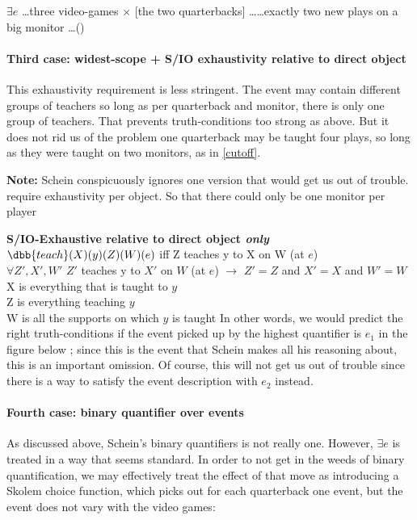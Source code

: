 \ex
$\exists e$ \ldots three video-games $\times$ [the two quarterbacks] \ldots  \ldots exactly two new plays on a big monitor \ldots ()

\xe
%


\paragraph{Third case: widest-scope + S/IO exhaustivity relative to direct object} This exhaustivity requirement is less stringent. The event may contain different groups of teachers so long as per quarterback and monitor, there is only one group of teachers. That prevents truth-conditions too strong as above. But it does not rid us of the problem one quarterback may be taught four plays, so long as they were taught on two monitors, as in \cref{cutoff}.

\textbf{Note:} Schein conspicuously ignores one version that would get us out of trouble. \cnextx require exhaustivity per object. So that there could only be one monitor per player

\pex \textbf{S/IO-Exhaustive relative to direct object \emph{only}}
\a 
$\dbb{teach}(X)(y)(Z)(W)(e)$ iff Z teaches y to X on W (at $e$)\\
$\forall Z', X', W'$ $Z'$ teaches y to $X'$ on $W$ (at $e$) $\rightarrow$ $Z'=Z$ and $X'=X$ and $W'=W$\\
\a 
X is everything that is taught to $y$\\
Z is everything teaching $y$\\
W is all the supports on which $y$ is taught
\xe
%
In other words, we would predict the right truth-conditions if the event picked up by the highest quantifier is $e_1$ in the figure below ; since this is the event that Schein makes all his reasoning about, this is an important omission. Of course, this will not get us out of trouble since there is a way to satisfy the event description with $e_2$ instead.

\ex
\renewcommand{\scale}{0.75}

\xe
%


\paragraph{Fourth case: binary quantifier over events} As discussed above, Schein's binary quantifiers is not really one. However, $\exists e$ is treated in a way that seems standard. In order to not get in the weeds of binary quantification, we may effectively treat the effect of that move as introducing a Skolem choice function, which picks out for each quarterback one event, but the event does not vary with the video games:

